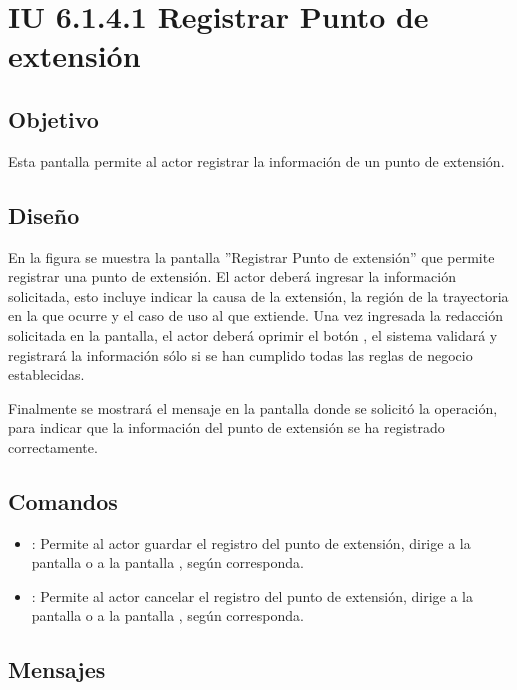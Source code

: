 \section{IU 6.1.4.1 Registrar Punto de extensión}

\subsection{Objetivo}
	Esta pantalla permite al actor registrar la información de un punto de extensión.
\subsection{Diseño}
	En la figura  se muestra la pantalla ''Registrar Punto de extensión'' que permite registrar una punto de extensión. El actor deberá ingresar la información solicitada, esto incluye indicar la causa de la extensión, la región de la trayectoria en la que ocurre y el caso de uso al que extiende.
	Una vez ingresada la redacción solicitada en la pantalla, el actor deberá oprimir el botón , el sistema validará y registrará la información sólo si se han cumplido todas las reglas de negocio establecidas.
	
	Finalmente se mostrará el mensaje  en la pantalla donde se solicitó la operación, para indicar que la información del punto de extensión se ha registrado correctamente.

\subsection{Comandos}
\begin{itemize}
	\item {}: Permite al actor guardar el registro del punto de extensión, dirige a la pantalla  o a la pantalla , según corresponda.
	\item {}: Permite al actor cancelar el registro del punto de extensión, dirige a la pantalla  o a la pantalla , según corresponda.
\end{itemize}

\subsection{Mensajes}


